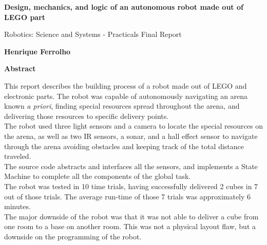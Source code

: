 \thispagestyle{plain}

\begin{center}
    \Large
    \textbf{Design, mechanics, and logic of an autonomous robot made out of LEGO part}

    \vspace{0.4cm}
    \large
    Robotics: Science and Systems - Practicals Final Report

    \vspace{0.4cm}
    \textbf{Henrique Ferrolho}

    \vspace{0.9cm}
    \textbf{Abstract}
\end{center}

\bigskip

This report describes the building process of a robot made out of LEGO and electronic parts. The robot was capable of autonomously navigating an arena known \textit{a priori}, finding special resources spread throughout the arena, and delivering those resources to specific delivery points.\\
The robot used three light sensors and a camera to locate the special resources on the arena, as well as two IR sensors, a sonar, and a hall effect sensor to navigate through the arena avoiding obstacles and keeping track of the total distance traveled.\\
The source code abstracts and interfaces all the sensors, and implements a State Machine to complete all the components of the global task.\\
The robot was tested in 10 time trials, having successfully delivered 2 cubes in 7 out of those trials. The average run-time of those 7 trials was approximately 6 minutes.\\
The major downside of the robot was that it was not able to deliver a cube from one room to a base on another room. This was not a physical layout flaw, but a downside on the programming of the robot.

\newpage
